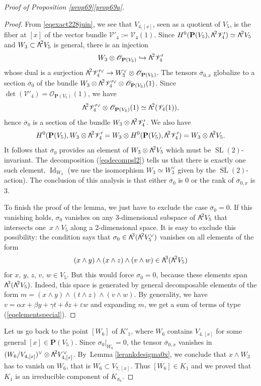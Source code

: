 \documentclass[11pt]{article}
\let\mathcal\mathscr
\newcommand\hto{\mathrel{\lhook\joinrel\to}}
\theoremstyle{definition}
\renewcommand\P{{\mathbf P}}\let\PP\P
\newcommand\cO{\mathcal{O}}\let\OO\cO
\newcommand\cV{\mathcal{V}}
\let\isom\simeq
\let\eps\varepsilon
\let\cong\simeq
\let\dual\vee
\DeclareMathOperator{\Id}{Id}
\DeclareMathOperator{\SL}{SL}
\newcommand\bw[1]{{\hbox{\large$\mathsf{\Lambda}$}^{\!#1}}}
\begin{document}
\begin{proof}[Proof of Proposition \ref{prop69}\eqref{prop69a}]
\begin{proof}
From \eqref{eqexact228juin}, we see that $V_{4,[x]}$, seen as a quotient of $V_5$, is the fiber at $[x]$ of the vector bundle $\cV'_4:=\cV_4(1)$. Since $H^0(\P(V_5),\bw2\cV'_4)\isom \bw2V_5$ and $W_3\subset \bw2V_5$ is general, there is an injection
\[
 W_3\otimes \cO_{\P(V_5)}\hto \bw2\cV'_4
\]
whose dual is a
surjection $\bw2\cV_4^{\prime\dual}\to W_3^\dual\otimes \cO_{\P(V_5)}$. The tensors $\overline{\sigma}_{0,x} $
globalize to a section $\overline{\sigma}_0$ of the bundle $W_3\otimes \bw2\cV_4^{\prime\dual}\otimes \cO_{\P(V_5)}(1)$.
Since $\det(\cV'_4)=\cO_{\P(V_5)}(1)$, we have
\[
\bw2\cV_4^{\prime\dual}\otimes \cO_{\P(V_5)}(1)\cong \bw2(\cV_4(1)),
\]
hence $\overline{\sigma}_0$ is a section of the bundle $W_3\otimes \bw2\cV_4'$.
We also have
\[
H^0(\P(V_5),W_3\otimes \bw2\cV_4'=W_3\otimes H^0(\P(V_5),\bw2\cV_4')=W_3\otimes \bw2V_5.
\]
It follows that $\overline{\sigma}_0$ provides an element of $W_3\otimes \bw2V_5$ which must
be $\SL(2)$-invariant. The decomposition (\ref{eqdecompsl2}) tells us that there is exactly
one such element, $\Id_{W_3}$ (we use the isomorphism $W_3\cong W_3^\dual$ given by the $\SL(2)$-action).
The conclusion of this analysis is that either $\overline{\sigma}_0$ is $0$ or the rank of $\overline{\sigma}_{0,x}$ is $3$.

To finish the proof of the lemma, we just have to exclude the case
$\overline{\sigma}_0=0$. If this vanishing holds, $\sigma_0$ vanishes on any $3$-dimensional subspace of $\bw2 V_5$ that intersects
one~$x\wedge V_5$ along a $2$-dimensional space. It is easy to exclude this possibility: the condition says that $\sigma_0\in\bw3(\bw2V_5^\dual)$ vanishes on all elements of the form
\begin{equation}
\label{eqelementspecial}
(x\wedge y)\wedge (x\wedge z)\wedge( v\wedge w)\in \bw3(\bw2V_5)
\end{equation}
for $x,\,y,\,z,\,v,\,w\in V_5$. But this would force $\sigma_0=0$, because these elements span $\bw3(\bw2V_5)$. Indeed,
this space is generated by general
decomposable elements of the form $m=(x\wedge y)\wedge (t\wedge z)\wedge( v\wedge w)$. By generality, we have
$v=\alpha x+\beta y+\gamma t+\delta z+\eps w$ and expanding $m$, we get a sum of terms of
type (\ref{eqelementspecial}).
\end{proof}

Let us go back to the point $[W_6]$ of $K'_1$, where $W_6$ contains $ V_{4,[x]}$ for some general $[x]\in\P(V_5)$. Since $\sigma_{0}\vert_{ W_6}=0$, the
tensor $\overline{\sigma}_{0,x}$ vanishes in $(W_6/V_{4,[x]})^\dual\otimes \bw2V_{4,[x]}^\dual$.
By~Lemma \ref{lerankdesigma0x}, we conclude that $x\wedge W_3$ has to vanish on $W_6$, that is
$W_6\subset V_{7,[x]}$. Thus $[W_6]\in K_1$ and we proved that $K_1$ is an irreducible component
of $K_{\sigma_0}$.


\end{proof}
\end{document}
